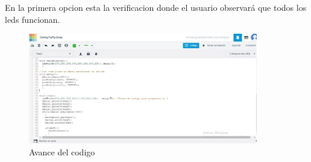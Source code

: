 \documentclass{article}
\begin{document}
En la primera opcion esta la verificacion donde el usuario observará que todos los leds funcionan.
\newpage
\begin{figure}[h]
\includegraphics[width=10cm]{Avance 2.jpeg}
\centering
\caption{Avance del codigo}
\label{fig:Avance 2}
\end{figure}
\end{document}
